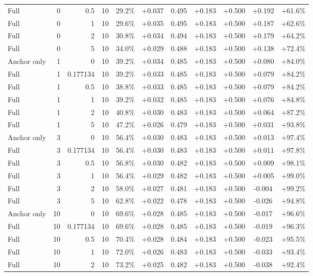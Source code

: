 \begin{table}[htbp]
\begin{tabular}{lrrrccccccc}
Full & 0 & 0.5 & 10 & 29.2\% & +0.037 & 0.495 & +0.183 & +0.500 & +0.192 & +61.6\% \\
Full & 0 & 1 & 10 & 29.6\% & +0.035 & 0.495 & +0.183 & +0.500 & +0.187 & +62.6\% \\
Full & 0 & 2 & 10 & 30.8\% & +0.034 & 0.494 & +0.183 & +0.500 & +0.179 & +64.2\% \\
Full & 0 & 5 & 10 & 34.0\% & +0.029 & 0.488 & +0.183 & +0.500 & +0.138 & +72.4\% \\
Anchor only & 1 & 0 & 10 & 39.2\% & +0.034 & 0.485 & +0.183 & +0.500 & +0.080 & +84.0\% \\
Full & 1 & 0.177134 & 10 & 39.2\% & +0.033 & 0.485 & +0.183 & +0.500 & +0.079 & +84.2\% \\
Full & 1 & 0.5 & 10 & 38.8\% & +0.033 & 0.485 & +0.183 & +0.500 & +0.079 & +84.2\% \\
Full & 1 & 1 & 10 & 39.2\% & +0.032 & 0.485 & +0.183 & +0.500 & +0.076 & +84.8\% \\
Full & 1 & 2 & 10 & 40.8\% & +0.030 & 0.483 & +0.183 & +0.500 & +0.064 & +87.2\% \\
Full & 1 & 5 & 10 & 47.2\% & +0.026 & 0.479 & +0.183 & +0.500 & +0.031 & +93.8\% \\
Anchor only & 3 & 0 & 10 & 56.4\% & +0.030 & 0.483 & +0.183 & +0.500 & +0.013 & +97.4\% \\
Full & 3 & 0.177134 & 10 & 56.4\% & +0.030 & 0.483 & +0.183 & +0.500 & +0.011 & +97.8\% \\
Full & 3 & 0.5 & 10 & 56.8\% & +0.030 & 0.482 & +0.183 & +0.500 & +0.009 & +98.1\% \\
Full & 3 & 1 & 10 & 56.4\% & +0.029 & 0.482 & +0.183 & +0.500 & +0.005 & +99.0\% \\
Full & 3 & 2 & 10 & 58.0\% & +0.027 & 0.481 & +0.183 & +0.500 & -0.004 & +99.2\% \\
Full & 3 & 5 & 10 & 62.8\% & +0.022 & 0.478 & +0.183 & +0.500 & -0.026 & +94.8\% \\
Anchor only & 10 & 0 & 10 & 69.6\% & +0.028 & 0.485 & +0.183 & +0.500 & -0.017 & +96.6\% \\
Full & 10 & 0.177134 & 10 & 69.6\% & +0.028 & 0.485 & +0.183 & +0.500 & -0.019 & +96.3\% \\
Full & 10 & 0.5 & 10 & 70.4\% & +0.028 & 0.484 & +0.183 & +0.500 & -0.023 & +95.5\% \\
Full & 10 & 1 & 10 & 72.0\% & +0.026 & 0.483 & +0.183 & +0.500 & -0.033 & +93.4\% \\
Full & 10 & 2 & 10 & 73.2\% & +0.025 & 0.482 & +0.183 & +0.500 & -0.038 & +92.4\% \\

\end{tabular}
\end{table}
